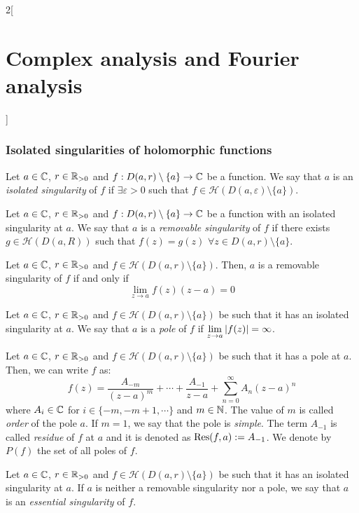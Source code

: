 \documentclass[../../../main.tex]{subfiles}
\begin{document}
\begin{multicols}{2}[\section{Complex analysis and Fourier analysis}]
  \subsubsection{Isolated singularities of holomorphic functions}
  \begin{definition}
    Let $a\in\mathbb{C}$, $r\in\mathbb{R}_{>0}$ and $f:D(a,r)\setminus\{a\}\rightarrow\mathbb{C}$ be a function. We say that $a$ is an \emph{isolated singularity} of $f$ if $\exists \varepsilon>0$ such that $f\in\mathcal{H}(D(a,\varepsilon)\setminus\{a\})$.
  \end{definition}
  \begin{definition}
    Let $a\in\mathbb{C}$, $r\in\mathbb{R}_{>0}$ and $f:D(a,r)\setminus\{a\}\rightarrow\mathbb{C}$ be a function with an isolated singularity at $a$. We say that $a$ is a \emph{removable singularity} of $f$ if there exists $g\in \mathcal{H}(D(a,R))$ such that $f(z)=g(z)$ $\forall z\in D(a,r)\setminus\{a\}$.
  \end{definition}
  \begin{theorem}
    Let $a\in\mathbb{C}$, $r\in\mathbb{R}_{>0}$ and $f\in\mathcal{H}(D(a,r)\setminus\{a\})$. Then, $a$ is a removable singularity of $f$ if and only if $$\lim_{z\to a}f(z)(z-a)=0$$
  \end{theorem}
  \begin{definition}
    Let $a\in\mathbb{C}$, $r\in\mathbb{R}_{>0}$ and $f\in\mathcal{H}(D(a,r)\setminus\{a\})$ be such that it has an isolated singularity at $a$. We say that $a$ is a \emph{pole} of $f$ if $\displaystyle\lim_{z\to a}\abs{f(z)}=\infty$.
  \end{definition}
  \begin{proposition}[Pole]
    Let $a\in\mathbb{C}$, $r\in\mathbb{R}_{>0}$ and $f\in\mathcal{H}(D(a,r)\setminus\{a\})$ be such that it has a pole at $a$. Then, we can write $f$ as: $$f(z)=\frac{A_{-m}}{{(z-a)}^m}+\cdots+\frac{A_{-1}}{z-a}+\sum_{n=0}^\infty A_n{(z-a)}^n$$ where $A_i\in\mathbb{C}$ for $i\in\{-m,-m+1,\cdots\}$ and $m\in\mathbb{N}$. The value of $m$ is called \emph{order} of the pole $a$. If $m=1$, we say that the pole is \emph{simple}. The term $A_{-1}$ is called \emph{residue} of $f$ at $a$ and it is denoted as $\Res(f,a):=A_{-1}$. We denote by $P(f)$ the set of all poles of $f$.
  \end{proposition}
  \begin{definition}
    Let $a\in\mathbb{C}$, $r\in\mathbb{R}_{>0}$ and $f\in\mathcal{H}(D(a,r)\setminus\{a\})$ be such that it has an isolated singularity at $a$. If $a$ is neither a removable singularity nor a pole, we say that $a$ is an \emph{essential singularity} of $f$.

\end{definition}
\end{multicols}
\end{document}
